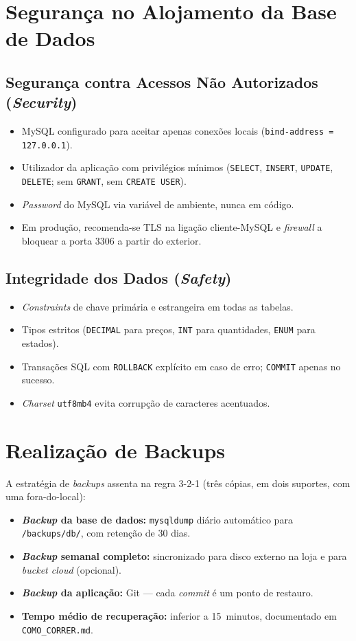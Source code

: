 \documentclass[11pt,a4paper]{report}
\begin{document}
\section{Segurança no Alojamento da Base de Dados}

\subsection{Segurança contra Acessos Não Autorizados (\textit{Security})}
\begin{itemize}
  \item MySQL configurado para aceitar apenas conexões locais (\texttt{bind-address = 127.0.0.1}).
  \item Utilizador da aplicação com privilégios mínimos (\texttt{SELECT}, \texttt{INSERT}, \texttt{UPDATE}, \texttt{DELETE}; sem \texttt{GRANT}, sem \texttt{CREATE USER}).
  \item \textit{Password} do MySQL via variável de ambiente, nunca em código.
  \item Em produção, recomenda-se TLS na ligação cliente-MySQL e \textit{firewall} a bloquear a porta 3306 a partir do exterior.
\end{itemize}

\subsection{Integridade dos Dados (\textit{Safety})}
\begin{itemize}
  \item \textit{Constraints} de chave primária e estrangeira em todas as tabelas.
  \item Tipos estritos (\texttt{DECIMAL} para preços, \texttt{INT} para quantidades, \texttt{ENUM} para estados).
  \item Transações SQL com \texttt{ROLLBACK} explícito em caso de erro; \texttt{COMMIT} apenas no sucesso.
  \item \textit{Charset} \texttt{utf8mb4} evita corrupção de caracteres acentuados.
\end{itemize}

\section{Realização de Backups}
A estratégia de \textit{backups} assenta na regra 3-2-1 (três cópias, em dois suportes, com uma fora-do-local):

\begin{itemize}
  \item \textbf{\textit{Backup} da base de dados:} \texttt{mysqldump} diário automático para \texttt{/backups/db/}, com retenção de 30 dias.
  \item \textbf{\textit{Backup} semanal completo:} sincronizado para disco externo na loja e para \textit{bucket cloud} (opcional).
  \item \textbf{\textit{Backup} da aplicação:} Git --- cada \textit{commit} é um ponto de restauro.
  \item \textbf{Tempo médio de recuperação:} inferior a 15~minutos, documentado em \texttt{COMO\_CORRER.md}.
\end{itemize}
\end{document}
